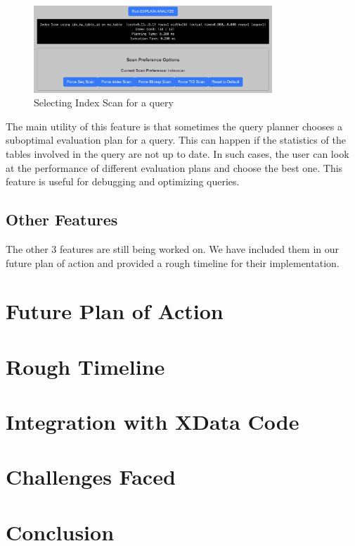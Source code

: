 \documentclass{article}
\begin{document}
\begin{figure}[htbp]
    \centering
    \includegraphics[width=0.8\textwidth]{index.png}
    \caption{Selecting Index Scan for a query}
\end{figure}

The main utility of this feature is that sometimes the query planner chooses a suboptimal evaluation plan for a query. This can happen if the statistics of the tables involved in the query are not up to date. In such cases, the user can look at the performance of different evaluation plans and choose the best one. This feature is useful for debugging and optimizing queries.


\subsection{Other Features}

The other 3 features are still being worked on. We have included them in our future plan of action and provided a rough timeline for their implementation.

\section{Future Plan of Action}

\section{Rough Timeline}

\section{Integration with XData Code}

\section{Challenges Faced}

\section{Conclusion}

    
\end{document}
